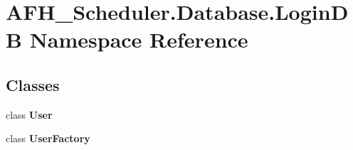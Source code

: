 \section{A\+F\+H\+\_\+\+Scheduler.\+Database.\+Login\+DB Namespace Reference}
\label{namespace_a_f_h___scheduler_1_1_database_1_1_login_d_b}
\subsection*{Classes}
\begin{DoxyCompactItemize}
\item 
class \textbf{ User}
\item 
class {\bfseries User\+Factory}
\end{DoxyCompactItemize}
